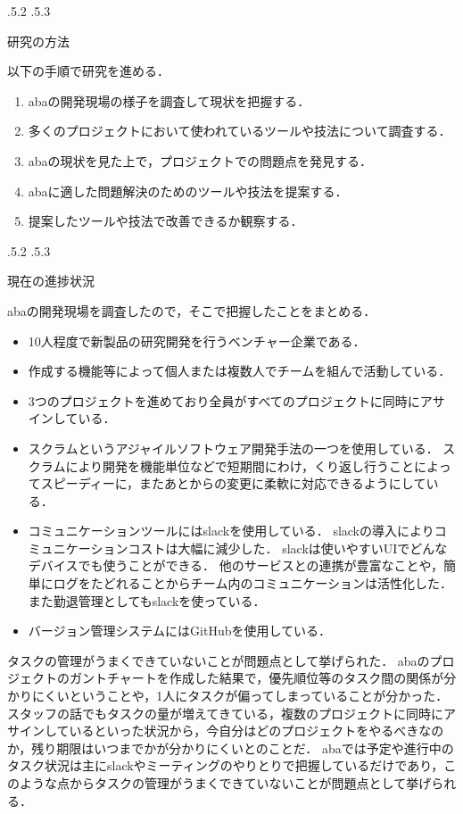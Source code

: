 \documentclass[uplatex]{jsarticle}
\makeatletter
\renewcommand{\section}{%
    \if@slide\clearpage\fi
    \@startsection{section}{1}{\z@}%
    {\Cvs \@plus.5\Cdp \@minus.2\Cdp}%
    {.5\Cvs \@plus.3\Cdp}%
    {\normalfont\raggedright}}
\makeatother
\begin{document}
\section{研究の方法}

以下の手順で研究を進める．
\begin{enumerate}
\item abaの開発現場の様子を調査して現状を把握する．
\item 多くのプロジェクトにおいて使われているツールや技法について調査する．
\item abaの現状を見た上で，プロジェクトでの問題点を発見する．
\item abaに適した問題解決のためのツールや技法を提案する．
\item 提案したツールや技法で改善できるか観察する．
\end{enumerate}



\section{現在の進捗状況}

abaの開発現場を調査したので，そこで把握したことをまとめる．
\begin{itemize}
\item 10人程度で新製品の研究開発を行うベンチャー企業である．
\item 作成する機能等によって個人または複数人でチームを組んで活動している．
\item 3つのプロジェクトを進めており全員がすべてのプロジェクトに同時にアサインしている．
\item スクラムというアジャイルソフトウェア開発手法の一つを使用している\cite{nagase2012}．
スクラムにより開発を機能単位などで短期間にわけ，くり返し行うことによってスピーディーに，またあとからの変更に柔軟に対応できるようにしている．
\item コミュニケーションツールにはslackを使用している．
slackの導入によりコミュニケーションコストは大幅に減少した．
slackは使いやすいUIでどんなデバイスでも使うことができる．
他のサービスとの連携が豊富なことや，簡単にログをたどれることからチーム内のコミュニケーションは活性化した．
また勤退管理としてもslackを使っている．
\item バージョン管理システムにはGitHubを使用している．
\end{itemize}

タスクの管理がうまくできていないことが問題点として挙げられた．
abaのプロジェクトのガントチャートを作成した結果で，優先順位等のタスク間の関係が分かりにくいということや，1人にタスクが偏ってしまっていることが分かった．
スタッフの話でもタスクの量が増えてきている，複数のプロジェクトに同時にアサインしているといった状況から，今自分はどのプロジェクトをやるべきなのか，残り期限はいつまでかが分かりにくいとのことだ．
abaでは予定や進行中のタスク状況は主にslackやミーティングのやりとりで把握しているだけであり，このような点からタスクの管理がうまくできていないことが問題点として挙げられる．
\end{document}
